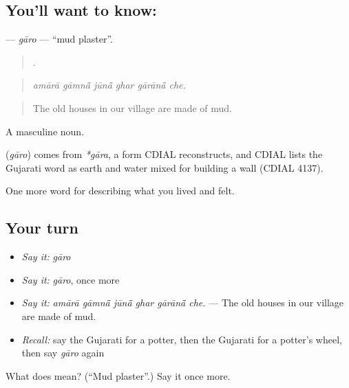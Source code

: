 \subsection*{You'll want to know: }
\textbf{} — \emph{gāro} — \textquotedblleft{}mud plaster\textquotedblright{}.

\begin{quote}
     .
\end{quote}

\begin{quote}
\emph{amārā gāmnā̃ jūnā̃ ghar gārānā̃ che.}
\end{quote}

\begin{quote}
The old houses in our village are made of mud.
\end{quote}

A masculine noun.

\begin{cousinweb}
\textbf{} (\emph{gāro}) comes from \emph{*gāra}, a form CDIAL reconstructs, and CDIAL lists the Gujarati word as earth and water mixed for building a wall (CDIAL 4137).
\end{cousinweb}

\begin{grammarlens}[title={What you've built}]
One more word for describing what you lived and felt.
\end{grammarlens}

\subsection*{Your turn}
\begin{itemize}
\raggedright
  \item \emph{Say it:} \emph{gāro}
  \item \emph{Say it:} \emph{gāro}, once more
  \item \emph{Say it:} \emph{amārā gāmnā̃ jūnā̃ ghar gārānā̃ che.} — The old houses in our village are made of mud.
  \item \emph{Recall:} say the Gujarati for a potter, then the Gujarati for a potter's wheel, then say \emph{gāro} again
\end{itemize}

\begin{tcolorbox}[breakable,colback=teal!4,colframe=teal!35!black,title={Before you move on}]
What does  mean? (\textquotedblleft{}Mud plaster\textquotedblright{}.) Say it once more.
\end{tcolorbox}
